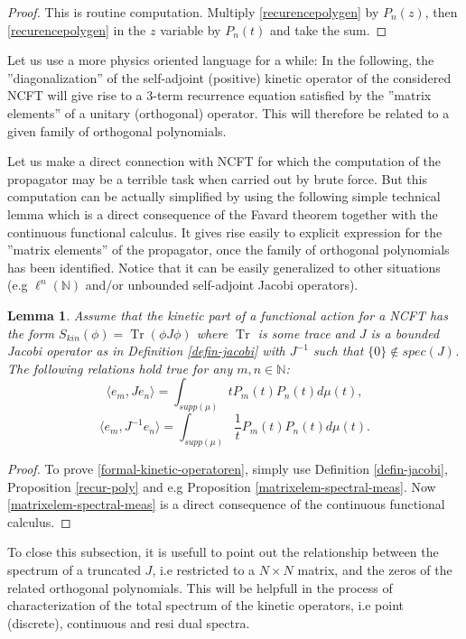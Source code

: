 \documentclass[a4paper,11pt,twoside]{article}
\numberwithin{equation}{section}
\DeclareMathOperator{\tr}{Tr}
\newtheorem{lemma}[Theorem]{Lemma}
\theoremstyle{nonumberplain}
\newtheorem{proof}{Proof}
\newcounter{and}
\begin{document}
\begin{proof}
This is routine computation. Multiply \eqref{recurencepolygen} by $P_{n}(z)$, then \eqref{recurencepolygen} in the $z$ variable by $P_n(t)$ and take the sum.
\end{proof}
Let us use a more physics oriented language for a while: In the following, the ''diagonalization'' of the self-adjoint (positive) kinetic operator of the considered NCFT will give rise to a 3-term recurrence equation satisfied by the ''matrix elements'' of a unitary (orthogonal) operator. This will therefore be related to a given family of orthogonal polynomials. \par  
Let us make a direct connection with NCFT for which the computation of the propagator may be a terrible task when carried out by brute force. But this computation can be actually simplified by using the following simple technical lemma which is a direct consequence of the Favard theorem together with the continuous functional calculus. It gives rise easily to explicit expression for the ''matrix elements'' of the propagator, once the family of orthogonal polynomials has been identified. Notice that it can be easily generalized to other situations (e.g $\ell^n(\mathbb{N})$ and/or unbounded self-adjoint Jacobi operators).
\begin{lemma}\label{propagator}
Assume that the kinetic part of a functional action for a NCFT has the form $S_{kin}(\phi)=\tr(\phi J\phi)$ where $\tr$ is some trace and $J$ is a bounded Jacobi operator as in Definition \ref{defin-jacobi} with $J^{-1}$ such that $\{0\}\notin spec(J)$. The following relations hold true for any $m,n\in\mathbb{N}$:
\begin{equation}
\langle e_m,J e_n \rangle=\int_{supp(\mu)}tP_m(t)P_n(t)d\mu(t),\label{formal-kinetic-operatoren}
\end{equation}
\begin{equation}
 \langle e_m,J^{-1} e_n\rangle=\int_{supp(\mu)}\frac{1}{t}P_m(t)P_n(t)d\mu(t)\label{formal-propagatoren}.
\end{equation}
\end{lemma}
\begin{proof}
To prove \eqref{formal-kinetic-operatoren}, simply use Definition \ref{defin-jacobi}, Proposition \ref{recur-poly} and e.g Proposition \ref{matrixelem-spectral-meas}. Now \eqref{matrixelem-spectral-meas} is a direct consequence of the continuous functional calculus.
\end{proof}
To close this subsection, it is usefull to point out the relationship between the spectrum of a truncated $J$, i.e restricted to a $N\times N$ matrix, and the zeros of the related orthogonal polynomials. This will be helpfull in the process of characterization of the total spectrum of the kinetic operators, i.e point (discrete), continuous and resi dual spectra.
\end{document}
